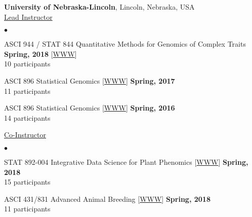 \documentclass[margin,line,10pt]{res}
\newenvironment{list2}{
  \begin{list}{$\bullet$}{%
      \setlength{\itemsep}{0in}
      \setlength{\parsep}{0in} \setlength{\parskip}{0in}
      \setlength{\topsep}{0in} \setlength{\partopsep}{0in} 
      \setlength{\leftmargin}{0.2in}}}{\end{list}}
\begin{document}
\begin{resume}
 
      \vspace{1cm}


{\bf University of Nebraska-Lincoln}, Lincoln, Nebraska, USA  \vspace{0.2cm} \\
\underline{Lead Instructor}
\vspace{0.4cm}
\begin{list2}

\item ASCI 944 / STAT 844 Quantitative Methods for Genomics of Complex Traits
  \hfill {\bf Spring, 2018} 
         [\textcolor{blue}{\href{http://morotalab.org/asci944-2018/ASCI944.html}{WWW}}] \\
         10  participants %

   \vspace{0.5cm}

\item ASCI 896 Statistical Genomics [\textcolor{blue}{\href{http://morotalab.org/asci896-2017/ASCI896.html}{WWW}}]
  \hfill {\bf Spring, 2017} \\
  11  participants   %

  \vspace{0.5cm}

\item ASCI 896 Statistical Genomics [\textcolor{blue}{\href{http://morotalab.org/asci896-2016/ASCI896.html}{WWW}}]
  \hfill {\bf Spring, 2016} \\
14 participants %

\end{list2}
\vspace{.01pt}
        

\underline{Co-Instructor} 
\vspace{0.4cm}
\begin{list2}
  
\item STAT 892-004 Integrative Data Science for Plant Phenomics [\textcolor{blue}{\href{http://morotalab.org/stat892-2018/STAT892.html}{WWW}}]
  \hfill {\bf Spring, 2018} \\
  15 participants 

\vspace{0.5cm}
  
\item ASCI 431/831 Advanced Animal Breeding [\textcolor{blue}{\href{http://morotalab.org/asci431-2018/ASCI431-831.html}{WWW}}]
  \hfill {\bf Spring, 2018} \\
  11 participants 


\end{list2}
\end{resume}
\end{document}
